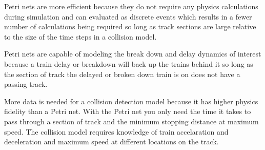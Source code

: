 Petri nets are more efficient because they do not require any physics
calculations during simulation and can evaluated as discrete events which
results in a fewer number of calculations being required so long as track
sections are large relative to the size of the time steps in a collision model.

Petri nets are capable of modeling the break down and delay dynamics of interest
because a train delay or breakdown will back up the trains behind it so long as
the section of track the delayed or broken down train is on does not have a
passing track. 

More data is needed for a collision detection model because it has higher
physics fidelity than a Petri net. With the Petri net you only need the time it
takes to pass through a section of track and the minimum stopping distance at
maximum speed. The collision model requires knowledge of train accelaration and
deceleration and maximum speed at different locations on the track.
